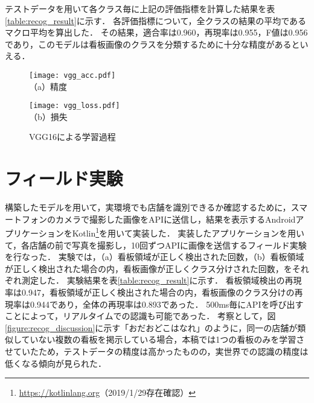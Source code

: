     テストデータを用いて各クラス毎に上記の評価指標を計算した結果を表\ref{table:recog_result}に示す．
    各評価指標について，全クラスの結果の平均であるマクロ平均を算出した．
    その結果，適合率は0.960，再現率は0.955，F値は0.956であり，このモデルは看板画像のクラスを分類するために十分な精度があるといえる．

    \begin{figure}[t]
      \begin{minipage}{0.49\hsize}
        \begin{center}
          \texttt{[image: vgg\_acc.pdf]}\\
          \small{（a）精度}
        \end{center}
      \end{minipage}
      \begin{minipage}{0.49\hsize}
        \begin{center}
          \texttt{[image: vgg\_loss.pdf]}\\
          \small{（b）損失}
        \end{center}
      \end{minipage}
      \vspace{2pt}
      \caption{VGG16による学習過程}
      \label{figure:vgg_training}
    \end{figure}

\section{フィールド実験}
  構築したモデルを用いて，実環境でも店舗を識別できるか確認するために，スマートフォンのカメラで撮影した画像をAPIに送信し，結果を表示するAndroidアプリケーションをKotlin\footnote{\url{https://kotlinlang.org}（2019/1/29存在確認）}を用いて実装した．
  実装したアプリケーションを用いて，各店舗の前で写真を撮影し，10回ずつAPIに画像を送信するフィールド実験を行なった．
  実験では，（a）看板領域が正しく検出された回数，（b）看板領域が正しく検出された場合の内，看板画像が正しくクラス分けされた回数，をそれぞれ測定した．
  実験結果を表\ref{table:recog_result}に示す．
  看板領域検出の再現率は0.947，看板領域が正しく検出された場合の内，看板画像のクラス分けの再現率は0.944であり，全体の再現率は0.893であった．
  500ms毎にAPIを呼び出すことによって，リアルタイムでの認識も可能であった．
  考察として，図\ref{figure:recog_discussion}に示す「おだおどこはなれ」のように，同一の店舗が類似していない複数の看板を掲示している場合，本稿では1つの看板のみを学習させていたため，テストデータの精度は高かったものの，実世界での認識の精度は低くなる傾向が見られた．


